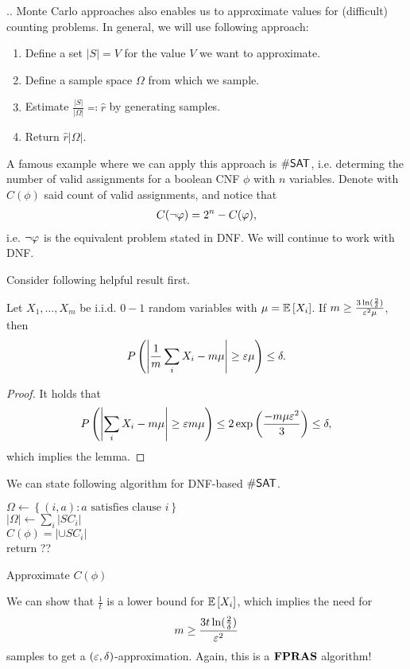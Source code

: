 ..
Monte Carlo approaches also enables us to approximate values for (difficult) counting problems.
In general, we will use following approach:
\begin{enumerate}
    \item Define a set $|S| = V$ for the value $V$ we want to approximate.
    \item Define a sample space $\Omega$ from which we sample.
    \item Estimate $\frac{|S|}{|\Omega|} \eqqcolon \hat r$ by generating samples.
    \item Return $\hat r |\Omega|$.
\end{enumerate}
A famous example where we can apply this approach is $\mathsf{\#SAT}$,
i.e. determing the number of valid assignments for
a boolean CNF $\phi$ with $n$ variables.
Denote with $C(\phi)$ said count of valid assignments, and notice that
\begin{align}
    C(\NOT \phi) = 2^n - C(\phi),
\end{align}
i.e. $\NOT \phi$ is the equivalent problem stated in DNF.
We will continue to work with DNF.

Consider following helpful result first.
\begin{lemma}
    Let $X_1, \dots, X_m$ be i.i.d. $0-1$ random variables with $\mu = \mathbb{E}\left[X_i\right]$.
    If $m \geq \frac{3 \ln (\frac{2}{\delta})}{\varepsilon^2 \mu}$, then
    \begin{align*}
        P\left(\left|\frac{1}{m}\sum_i X_i - m\mu \right| \geq \varepsilon \mu\right) \leq \delta.
    \end{align*}
\end{lemma}
\begin{proof}
    It holds that
    \begin{align*}
        P\left(\left|\sum_i X_i - m\mu \right| \geq \varepsilon m \mu\right) \leq 2 \exp \left(\frac{-m \mu \varepsilon^2}{3}\right) \leq \delta,
    \end{align*}
    which implies the lemma.
\end{proof}
We can state following algorithm for DNF-based $\mathsf{\#SAT}$.
\newline
\begin{algorithm}[H]
    \label{algo:approx_dnf_count_sat}
    \SetAlgoLined
    $\Omega \leftarrow \left\{(i,a) : a \text{ satisfies clause } i \right\}$\\
    $|\Omega| \leftarrow \sum_i |SC_i|$\\
    $C(\phi) = |\cup SC_i|$\\
    return ??
    \caption{Approximate $C(\phi)$}
\end{algorithm}
We can show that $\frac{1}{t}$ is a lower bound for $\mathbb{E}\left[X_i\right]$, which implies the need for
\begin{align}
    m \geq \frac{3t \ln(\frac{2}{\delta})}{\varepsilon^2}
\end{align}
samples to get a $(\varepsilon, \delta)$-approximation.
Again, this is a $\mathbf{FPRAS}$ algorithm!

